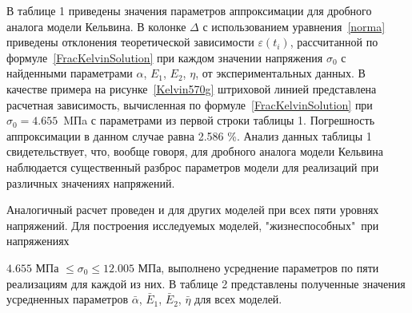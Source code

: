 \documentclass[11pt,a4paper,twoside]{article}
\begin{document}
В таблице 1 приведены значения параметров аппроксимации для дробного аналога модели Кельвина. В колонке $\Delta$ с использованием уравнения~\eqref{norma}  приведены отклонения теоретической зависимости $\varepsilon(t_{i})$,  рассчитанной по формуле~\eqref{FracKelvinSolution} при каждом значении напряжения $\sigma_{0}$ с найденными параметрами $\alpha$, $E_{1}$, $E_{2}$, $\eta$, от экспериментальных данных. В качестве примера на рисунке~\ref{Kelvin570g} штриховой линией представлена расчетная зависимость, вычисленная по формуле~\eqref{FracKelvinSolution} при $\sigma_{0}=4.655$~MПa с параметрами из первой строки таблицы 1. Погрешность аппроксимации в данном случае равна 2.586 \%. Анализ данных таблицы 1 свидетельствует, что, вообще говоря, для дробного аналога модели Кельвина наблюдается существенный разброс параметров модели для реализаций при различных значениях напряжений.





Аналогичный расчет проведен и для других моделей при всех пяти уровнях напряжений. Для построения исследуемых моделей, "жизнеспособных"\, при напряжениях 


$4.655$ МПа $\leq \sigma_{0} \leq 12.005$ МПа, выполнено усреднение параметров по пяти реализациям для каждой из них.  В таблице 2 представлены полученные значения усредненных параметров $\bar{\alpha}$, $\bar{E}_{1}$, $\bar{E}_{2}$, $\bar{\eta}$ для всех моделей.  


\smallskip 
\end{document}
